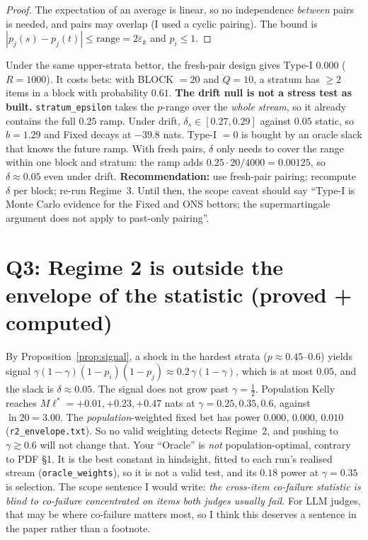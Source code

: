 \documentclass[11pt]{article}
\begin{document}
\begin{proof}
The expectation of an average is linear, so no independence \emph{between} pairs is needed, and pairs may overlap (I used a cyclic pairing). The bound is $|p_j(s)-p_j(t)|\le\mathrm{range}=2\varepsilon_k$ and $p_i\le1$.
\end{proof}
Under the same upper-strata bettor, the fresh-pair design gives Type-I $0.000$ ($R=1000$). It costs bets: with BLOCK $=20$ and $Q=10$, a stratum has $\ge2$ items in a block with probability $0.61$.
\textbf{The drift null is not a stress test as built.} \texttt{stratum\_epsilon} takes the $p$-range over the \emph{whole stream}, so it already contains the full $0.25$ ramp. Under drift, $\delta_s\in[0.27,0.29]$ against $0.05$ static, so $b=1.29$ and Fixed decays at $-39.8$ nats. Type-I $=0$ is bought by an oracle slack that knows the future ramp. With fresh pairs, $\delta$ only needs to cover the range within one block and stratum: the ramp adds $0.25\cdot20/4000=0.00125$, so $\delta\approx0.05$ even under drift.
\textbf{Recommendation:} use fresh-pair pairing; recompute $\delta$ per block; re-run Regime~3. Until then, the scope caveat should say ``Type-I is Monte Carlo evidence for the Fixed and ONS bettors; the supermartingale argument does not apply to past-only pairing''.

\section{Q3: Regime 2 is outside the envelope of the statistic (proved + computed)}
By Proposition~\ref{prop:signal}, a shock in the hardest strata ($p\approx0.45$--$0.6$) yields signal $\gamma(1-\gamma)(1-p_i)(1-p_j)\approx0.2\,\gamma(1-\gamma)$, which is at most $0.05$, and the slack is $\delta\approx0.05$. The signal does not grow past $\gamma=\tfrac12$. Population Kelly reaches $M\ell^\ast=+0.01,+0.23,+0.47$ nats at $\gamma=0.25,0.35,0.6$, against $\ln20=3.00$. The \emph{population}-weighted fixed bet has power $0.000$, $0.000$, $0.010$ (\texttt{r2\_envelope.txt}).
So no valid weighting detects Regime~2, and pushing to $\gamma\gtrsim0.6$ will not change that.
Your ``Oracle'' is \emph{not} population-optimal, contrary to PDF \S1. It is the best constant in hindsight, fitted to each run's realised stream (\texttt{oracle\_weights}), so it is not a valid test, and its $0.18$ power at $\gamma=0.35$ is selection.
The scope sentence I would write: \emph{the cross-item co-failure statistic is blind to co-failure concentrated on items both judges usually fail.} For LLM judges, that may be where co-failure matters most, so I think this deserves a sentence in the paper rather than a footnote.
\end{document}
